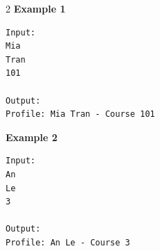 \documentclass[12pt,oneside,openany]{article}
\begin{document}
\vspace{0.2cm}

\begin{example*}{}{}
\begin{multicols}{2}
\textbf{Example 1}
\begin{verbatim}
Input:
Mia
Tran
101

Output:
Profile: Mia Tran - Course 101
\end{verbatim}
\textbf{Example 2}
\begin{verbatim}
Input:
An
Le
3

Output:
Profile: An Le - Course 3
\end{verbatim}
\end{multicols}
\end{example*}
\end{document}
